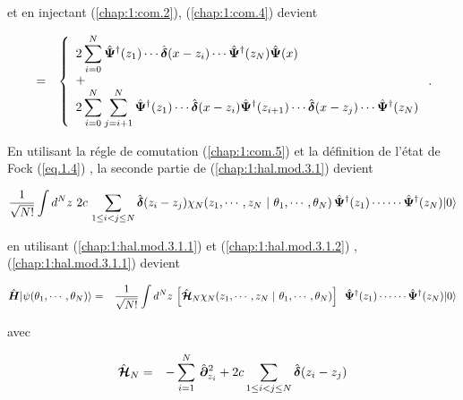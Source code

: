 et en injectant (\ref{chap:1:com.2}),  (\ref{chap:1:com.4}) devient 

\begin{eqnarray}
	[ \operator{\Psi}(x)\operator{\Psi}(x),  \operator{\Psi}^\dag(z_1)\cdots \operator{\Psi}^\dag(z_N)  ]  &=& \left\{ \begin{array}{l} \displaystyle 2\sum_{i = 0}^{N} \operator{\Psi}^\dag(z_1) \cdots  \operator{\delta}(x-z_i) \cdots \operator{\Psi}^\dag(z_N) \operator{\Psi}(x) \\ + \\ \displaystyle 2\sum_{i = 0}^{N}\sum_{j = i+1}^{N} \operator{\Psi}^\dag(z_1) \cdots\operator{\delta}(x-z_i)\operator{\Psi}^\dag(z_{i+1})\cdots  \operator{\delta}(x-z_j) \cdots \operator{\Psi}^\dag(z_N) \end{array}\right. \label{chap:1:com.5}	.	
\end{eqnarray}

En utilisant la régle de comutation (\ref{chap:1:com.5}) et la définition de l'état de Fock (\ref{eq.1.4}) , la seconde partie de (\ref{chap:1:hal.mod.3.1}) devient

\begin{eqnarray}
	 \frac{1}{ \sqrt{N!}} \int d^N z \,  \,2	c \,\sum_{1\leq i<j\leq N} \hat{\bm{\delta}}(z_i - z_j) \chi_N ( z_1 , \cdots , z_N  ~\vert ~ \theta_1 , \cdots , \theta _N ) \, \hat{\bm{\Psi}}^\dag(z_1) \cdots  \cdots\hat{\bm{\Psi}}^\dag(z_N) \vert 0 \rangle \label{chap:1:hal.mod.3.1.2}	
\end{eqnarray} 

en utilisant (\ref{chap:1:hal.mod.3.1.1}) et (\ref{chap:1:hal.mod.3.1.2}) , (\ref{chap:1:hal.mod.3.1.1}) devient 

\begin{eqnarray}
	\operator{H}\vert \psi ( \theta_1 , \cdots , \theta_N ) \rangle &= &  \frac{1}{ \sqrt{N!}} \int d^N z \,  	\left [ \operator{\mathcal{H}}_N \chi_N ( z_1 , \cdots , z_N  ~\vert ~ \theta_1 , \cdots , \theta _N ) \right ] \, \operator{\Psi}^\dag(z_1) \cdots  \cdots\operator{\Psi}^\dag(z_N) \vert 0 \rangle		
\end{eqnarray}

avec 

\begin{eqnarray}
	\hat{\bm{\mathcal{H}}}_N & = &  - \sum_{i=1}^N \, \hat{\bm{\partial}}_{z_i}^2 + 2	c \sum_{1\leq i<j\leq N} \hat{\bm{\delta}}(z_i - z_j) 		
\end{eqnarray}





